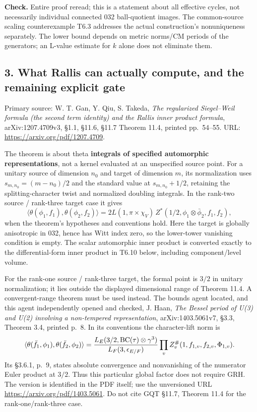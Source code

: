 \documentclass[11pt,a4paper]{article}
\theoremstyle{definition}
\begin{document}
\textbf{Check.} Entire proof reread; this is a statement about all effective cycles, not necessarily individual connected 032 ball-quotient images. The common-source scaling counterexample T6.3 addresses the actual construction's nonuniqueness separately. The lower bound depends on metric norms/CM periods of the generators; an L-value estimate for \(k\) alone does not eliminate them.

\subsection{3. What Rallis can actually compute, and the remaining explicit gate}\label{what-rallis-can-actually-compute-and-the-remaining-explicit-gate}

Primary source: W. T. Gan, Y. Qiu, S. Takeda, \emph{The regularized Siegel--Weil formula (the second term identity) and the Rallis inner product formula}, arXiv:1207.4709v3, §1.1, §11.6, §11.7 Theorem 11.4, printed pp.~54--55. URL: \url{https://arxiv.org/pdf/1207.4709}.

The theorem is about theta \textbf{integrals of specified automorphic representations}, not a kernel evaluated at an unspecified source point. For a unitary source of dimension \(n_0\) and target of dimension \(m\), its normalization uses \(s_{m,n_0}=(m-n_0)/2\) and the standard value at \(s_{m,n_0}+1/2\), retaining the splitting-character twist and normalized doubling integrals. In the rank-two source / rank-three target case it gives \[
\langle\theta(\phi_1,f_1),\theta(\phi_2,f_2)\rangle
=2L(1,\pi\times\chi_V)\,Z^*(1/2,\phi_1\otimes\bar\phi_2,f_1,f_2),
\tag{R1}
\] when the theorem's hypotheses and conventions hold. Here the target is globally anisotropic in 032, hence has Witt index zero, so the lower-tower vanishing condition is empty. The scalar automorphic inner product is converted exactly to the differential-form inner product in T6.10 below, including component/level volume.

For the rank-one source / rank-three target, the formal point is \(3/2\) in unitary normalization; it lies outside the displayed dimensional range of Theorem 11.4. A convergent-range theorem must be used instead. The bounds agent located, and this agent independently opened and checked, J. Haan, \emph{The Bessel period of U(3) and U(2) involving a non-tempered representation}, arXiv:1403.5061v7, §3.3, Theorem 3.4, printed p.~8. In its conventions the character-lift norm is \[
\langle\theta(\bar f_1,\phi_1),\theta(\bar f_2,\phi_2)\rangle
={L_E(3/2,\mathrm{BC}(\tau)\otimes\gamma^3)\over L_F(3,\epsilon_{E/F})}
\prod_v Z_v^\#(1,f_{1,v},f_{2,v},\Phi_{1,v}).
\] Its §3.6.1, p.~9, states absolute convergence and nonvanishing of the numerator Euler product at \(3/2\). Thus this particular global factor does not require GRH. The version is identified in the PDF itself; use the unversioned URL \url{https://arxiv.org/pdf/1403.5061}. Do not cite GQT §11.7, Theorem 11.4 for the rank-one/rank-three case.
\end{document}
